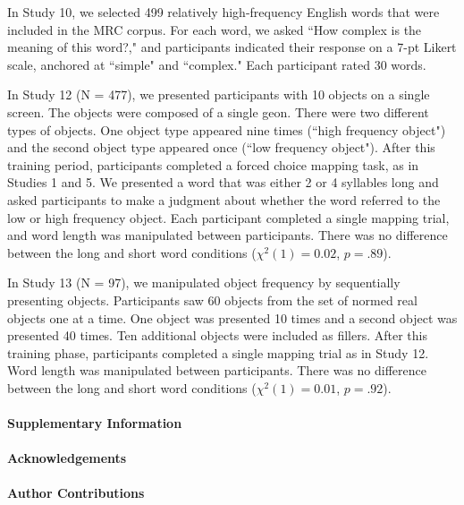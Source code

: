 \documentclass[12pt]{article}
\renewcommand\refname{References and Notes}
\begin{document}
In Study 10, we selected 499 relatively high-frequency English words that were included in the MRC corpus. For each word, we asked ``How complex is the meaning of this word?," and participants indicated their response on a 7-pt Likert scale, anchored at ``simple" and ``complex." Each participant rated 30 words.

In Study 12 (N = 477), we presented participants with 10 objects on a single screen. The objects were composed of a single geon. There were two different types of objects. One object type appeared nine times (``high frequency object") and the second object type appeared once (``low frequency object"). After this training period, participants completed a forced choice mapping task, as in Studies 1 and 5. We presented a word that was either 2 or 4 syllables long and asked participants to make a judgment about whether the word referred to the low or high frequency object. Each participant completed a single mapping trial, and word length was manipulated between participants. There was no difference between the long and short word conditions ($\chi ^2(1) = 0.02$,  $p = .89$).

In Study 13 (N = 97), we manipulated object frequency by sequentially presenting objects. Participants saw 60 objects from the  set of normed real objects one at a time. One object was presented 10 times and a second object was presented 40 times. Ten additional objects were included as fillers. After this training phase, participants completed a single mapping trial as in Study 12. Word length was manipulated between participants. There was no difference between the long and short word conditions ($\chi ^2(1) = 0.01$,  $p = .92$).

\renewcommand{\refname}{\normalsize References}



\paragraph*{Supplementary Information}

\paragraph*{Acknowledgements}

\paragraph*{Author Contributions}
\end{document}
